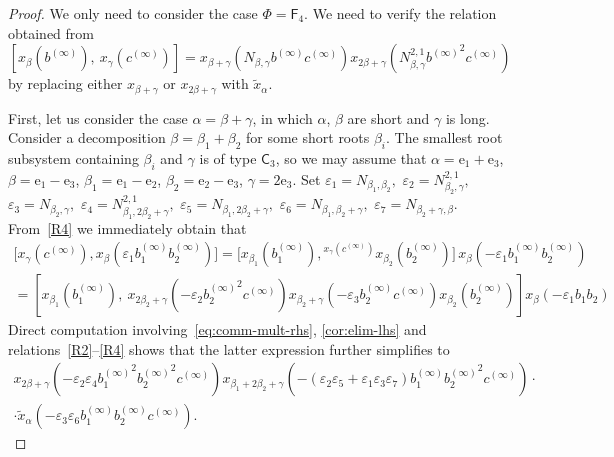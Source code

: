 \documentclass[oneside, 11pt]{amsart}
\numberwithin{equation}{section}
\theoremstyle{definition}
\theoremstyle{remark}
\newcommand{\up}[2]{{^{#1}\!{#2}}}
\newcommand{\rC}{\mathsf{C}}
\newcommand{\rF}{\mathsf{F}}
\begin{document}
\begin{proof}
We only need to consider the case $\Phi = \rF_4$.
We need to verify the relation obtained from \begin{equation}\label{eq:elim-rhs-r4-1} [x_{\beta}(b^{(\infty)}),\ x_{\gamma}(c^{(\infty)})] = x_{\beta+\gamma}(N_{\beta,\gamma}b^{(\infty)} c^{(\infty)}) x_{2\beta+\gamma}(N_{\beta,\gamma}^{2,1}{b^{(\infty)}}^2c^{(\infty)})\end{equation} by replacing either $x_{\beta+\gamma}$ or $x_{2\beta+\gamma}$ with $\widetilde{x}_{\alpha}$.

First, let us consider the case \(\alpha = \beta + \gamma\), in which \(\alpha\), \(\beta\) are short and \(\gamma\) is long. Consider a decomposition \(\beta = \beta_1 + \beta_2\) for some short roots \(\beta_i\). The smallest root subsystem containing \(\beta_i\) and \(\gamma\) is of type \(\rC_3\), so we may assume that \(\alpha = \mathrm e_1 + \mathrm e_3\), \(\beta = \mathrm e_1 - \mathrm e_3\), \(\beta_1 = \mathrm e_1 - \mathrm e_2\), \(\beta_2 = \mathrm e_2 - \mathrm e_3\), \(\gamma = 2\mathrm e_3\). Set $\varepsilon_1 = N_{\beta_1, \beta_2},$ $\varepsilon_2 = N_{\beta_2,\gamma}^{2,1},$ $\varepsilon_3 = N_{\beta_2, \gamma},$ $\varepsilon_4 = N_{\beta_1, 2\beta_2+\gamma}^{2,1},$ $\varepsilon_5 = N_{\beta_1, 2\beta_2+\gamma},$ $\varepsilon_6 = N_{\beta_1,\beta_2+\gamma},$ $\varepsilon_7 = N_{\beta_2+\gamma, \beta}.$ From~\eqref{R4} we immediately obtain that
 \begin{multline*}
  \bigl[x_\gamma(c^{(\infty)}), x_\beta(\varepsilon_1 b_1^{(\infty)} b_2^{(\infty)})\bigr]
  = \bigl[x_{\beta_1}(b_1^{(\infty)}), \up{x_\gamma(c^{(\infty)})} {x_{\beta_2}(b_2^{(\infty)})}\bigr]\,
  x_\beta(-\varepsilon_1 b_1^{(\infty)} b_2^{(\infty)}) \\
  =[x_{\beta_1}(b_1^{(\infty)}),\ x_{2\beta_2+\gamma}(-\varepsilon_2{b_2^{(\infty)}}^2c^{(\infty)}) x_{\beta_2+\gamma}(-\varepsilon_3b_2^{(\infty)}c^{(\infty)}) x_{\beta_2}(b_2^{(\infty)})] x_{\beta}(-\varepsilon_1b_1b_2) \end{multline*}
 Direct computation involving~\eqref{eq:comm-mult-rhs}, \cref{cor:elim-lhs} and relations~\eqref{R2}--\eqref{R4} shows that the latter expression further simplifies to
 \begin{multline*}  x_{2\beta + \gamma}( - \varepsilon_2 \varepsilon_4 {b_1^{(\infty)}}^2{b_2^{(\infty)}}^2c^{(\infty)}) x_{\beta_1 + 2\beta_2 + \gamma}(-(\varepsilon_2\varepsilon_5 +\varepsilon_1\varepsilon_3\varepsilon_7) b_1^{(\infty)}{b_2^{(\infty)}}^2c^{(\infty)}) \cdot \\ \cdot \widetilde{x}_{\alpha}(-\varepsilon_3 \varepsilon_6 b_1^{(\infty)}b_2^{(\infty)}c^{(\infty)}).\end{multline*}

\end{proof}
\end{document}
